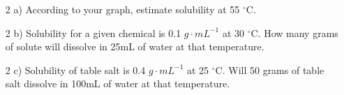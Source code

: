 \documentclass[main.tex]{subfiles}
\begin{document}
\begin{fullwidth}
\end{fullwidth}


\newpage
\begin{fullwidth}
\begin{center}
\end{center}


\vspace{0.6cm}{\large \bfseries PostLab questions }
\begin{enumerate}
\item[2 a)] According to your graph, estimate solubility at 55 $^\circ$C.
\vspace{3.7cm}
\item[2 b)] Solubility for a given chemical is 0.1 $g\cdot mL^{-1}$ at 30 $^\circ$C. How many grams of solute will dissolve in 25mL of water at that temperature.
\vspace{3.7cm}
\item[2 c)] Solubility of table salt is 0.4 $g\cdot mL^{-1}$ at 25 $^\circ$C. Will 50 grams of table salt dissolve in 100mL of water at that temperature.
\vspace{3.7cm}
\end{enumerate}


\end{fullwidth}
\end{document}
